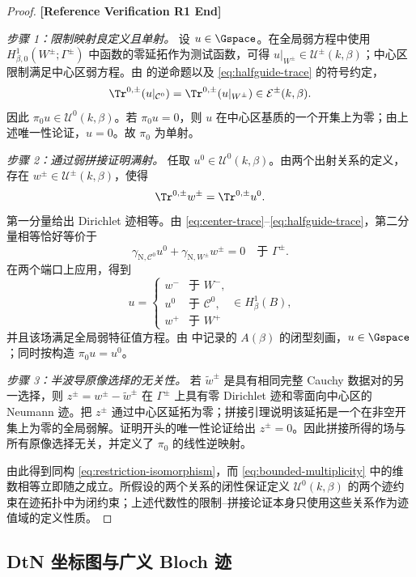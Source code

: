 \begin{proof}
\noindent\textbf{[Reference Verification R1 End]}
\endgroup
\par\smallskip

\emph{步骤 1：限制映射良定义且单射。}
设 $u\in\Gspace$。在全局弱方程中使用
$H^1_{\beta,0}(W^\pm;\Gamma^\pm)$ 中函数的零延拓作为测试函数，可得
$u|_{W^\pm}\in\mathcal U^\pm(k,\beta)$；中心区限制满足中心区弱方程。由 的逆命题以及
\eqref{eq:halfguide-trace} 的符号约定，
\[
  \Tr^{0,\pm}(u|_{\mathcal C^0})
  =\Tr^{0,\pm}(u|_{W^\pm})
  \in\mathcal E^\pm(k,\beta).
\]
因此 $\pi_0u\in\mathcal U^0(k,\beta)$。若
$\pi_0u=0$，则 $u$ 在中心区基质的一个开集上为零；由上述唯一性论证，$u=0$。故
$\pi_0$ 为单射。

\emph{步骤 2：通过弱拼接证明满射。}
任取 $u^0\in\mathcal U^0(k,\beta)$。由两个出射关系的定义，存在
$w^\pm\in\mathcal U^\pm(k,\beta)$，使得
\[
  \Tr^{0,\pm}w^\pm=\Tr^{0,\pm}u^0.
\]
第一分量给出 Dirichlet 迹相等。由
\eqref{eq:center-trace}--\eqref{eq:halfguide-trace}，第二分量相等恰好等价于
\[
  \gamma_{\mathrm N,\mathcal C^0}u^0+\gamma_{\mathrm N,W^\pm}w^\pm=0
  \quad\text{于 }\Gamma^\pm.
\]
在两个端口上应用，得到
\[
  u=\begin{cases}
    w^-&\text{于 }W^-,\\
    u^0&\text{于 }\mathcal C^0,\\
    w^+&\text{于 }W^+
  \end{cases}
  \in H^1_\beta(B),
\]
并且该场满足全局弱特征值方程。由 中记录的
$A(\beta)$ 的闭型刻画，$u\in\Gspace$；同时按构造
$\pi_0u=u^0$。

\emph{步骤 3：半波导原像选择的无关性。}
若 $\widetilde w^\pm$ 是具有相同完整 Cauchy 数据对的另一选择，则
$z^\pm=w^\pm-\widetilde w^\pm$ 在 $\Gamma^\pm$ 上具有零 Dirichlet 迹和零面向中心区的 Neumann 迹。把 $z^\pm$ 通过中心区延拓为零；拼接引理说明该延拓是一个在非空开集上为零的全局弱解。证明开头的唯一性论证给出 $z^\pm=0$。因此拼接所得的场与所有原像选择无关，并定义了
$\pi_0$ 的线性逆映射。

由此得到同构 \eqref{eq:restriction-isomorphism}，而
\eqref{eq:bounded-multiplicity} 中的维数相等立即随之成立。所假设的两个关系的闭性保证定义
$\mathcal U^0(k,\beta)$ 的两个迹约束在迹拓扑中为闭约束；上述代数性的限制--拼接论证本身只使用这些关系作为迹值域的定义性质。
\end{proof}

\subsection{DtN 坐标图与广义 Bloch 迹}

